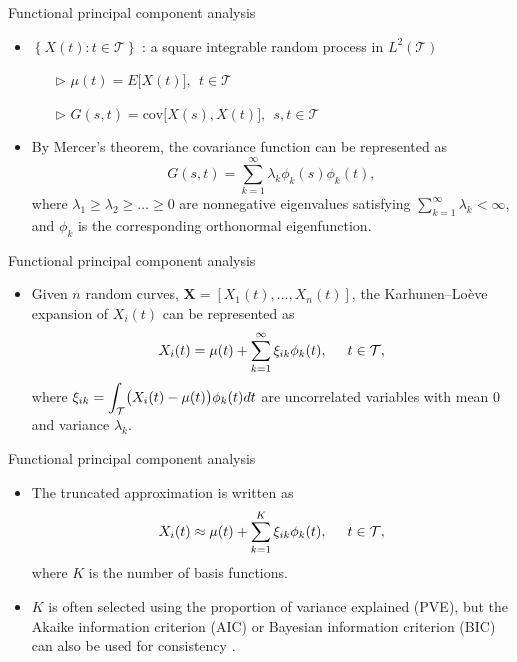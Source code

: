 \documentclass{beamer}
\def \bX { \mathbf{ X } }
\begin{document}
\begin{frame}{Functional principal component analysis}
	\begin{itemize}
		\item{
			$\left\{ X(t) : t \in \mathcal{T} \right\}$ : a square integrable random process in $L^2(\mathcal{T})$
			\begin{itemize}
				\item[$\triangleright$]{
					$\mu(t) = E\big[X(t)\big], ~~ t \in \mathcal{T}$
				}
				\item[$\triangleright$]{
					$G(s,t) = \text{cov}\big[X(s),X(t)\big], ~~ s, t \in \mathcal{T}$
				}
			\end{itemize}
		}
		\item{
			By Mercer's theorem, the covariance function can be represented as 
			$$G(s,t) = \sum_{k=1}^\infty \lambda_k \phi_k(s) \phi_k(t),$$ 
			where $\lambda_1 \ge \lambda_2 \ge \dots \ge 0 $ are nonnegative eigenvalues satisfying $\sum_{k=1}^\infty \lambda_k < \infty$, and $\phi_k$ is the corresponding orthonormal eigenfunction.
		}
	\end{itemize}
\end{frame}

\begin{frame}{Functional principal component analysis}
	\begin{itemize}
		\item{
			Given $n$ random curves, $\bX = [ X_1(t) , \ldots, X_n(t) ]$, the Karhunen--Lo\`{e}ve expansion of $X_i(t)$ can be represented as
			\begin{equation*}
				X_i(t) = \mu(t) + \sum_{k=1}^\infty \xi_{ik} \phi_k(t), \hspace{0.5cm} t \in \mathcal{T},
			\end{equation*}
			where $\xi_{ik} =\mathlarger{  \int}_{\mathcal{T} }  \big( X_i(t) - \mu(t) \big)\phi_k(t) dt $ are uncorrelated variables with mean 0 and variance $\lambda_k$. 
		}
	\end{itemize}
\end{frame}

\begin{frame}{Functional principal component analysis}
	\begin{itemize}
		\item{
			The truncated approximation is written as
			\begin{equation*}
			X_i(t) \approx \mu(t) + \sum_{k=1}^K \xi_{ik} \phi_k(t), \hspace{0.5cm} t \in \mathcal{T},
			\end{equation*}
			where $K$ is the number of basis functions.
		}
		\item{
			$K$ is often selected using the proportion of variance explained (PVE), but the Akaike information criterion (AIC) or Bayesian information criterion (BIC) can also be used for consistency \citep{Yao2005,Li2013}.
		}
	\end{itemize}
\end{frame}
\end{document}
